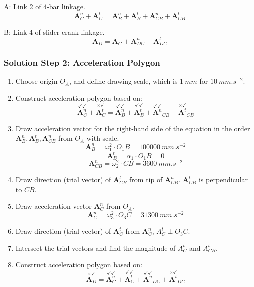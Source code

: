 \documentclass[11pt]{article}
\begin{document}
A: Link 2 of 4-bar linkage.
\[\boldsymbol{A}_C^n + \boldsymbol{A}_C^t = \boldsymbol{A}_B^n + \boldsymbol{A}_B^t + \boldsymbol{A}_{CB}^n + \boldsymbol{A}_{CB}^t\]

B: Link 4 of slider-crank linkage.
\[\boldsymbol{A}_D = \boldsymbol{A}_C + \boldsymbol{A}_{DC}^n + \boldsymbol{A}_{DC}^t\]

 \newpage
\subsubsection{Solution Step 2: Acceleration Polygon}
\label{sec:org25638ee}
\begin{enumerate}
\item Choose origin \(O_A\), and define drawing scale, which is \(\qty{1}{mm}\) for \(\qty{10}{mm.s^{-2}}\).
\item Construct acceleration polygon based on:
\[\overset{\checkmark \checkmark}{\boldsymbol{A}_C^n} + \overset{\times \checkmark}{\boldsymbol{A}_C^t} = \overset{\checkmark \checkmark}{\boldsymbol{A}_B^n} + \overset{\checkmark \checkmark}{\boldsymbol{A}_B^t} + \overset{\checkmark \checkmark}{\boldsymbol{A}^n}_{CB} + \overset{\times \checkmark}{\boldsymbol{A}^t}_{CB}\]
\item Draw acceleration vector for the right-hand side of the equation in the order \(\boldsymbol{A}_B^n, \boldsymbol{A}_B^t, \boldsymbol{A}_{CB}^n\) from \(O_A\) with scale.
\[\boldsymbol{A}_B^n = \omega_1^2 \cdot O_1 B = \qty{100000}{mm.s^{-2}}\]
\[\boldsymbol{A}_B^t = \alpha_1 \cdot O_1 B = 0\]
\[\boldsymbol{A}_{CB}^n = \omega_2^2 \cdot CB = \qty{3600}{mm.s^{-2}}\]
\item Draw direction (trial vector) of \(\boldsymbol{A}_{CB}^t\) from tip of \(\boldsymbol{A}_{CB}^n\). \(\boldsymbol{A}_{CB}^t\) is perpendicular to \(CB\).
\item Draw acceleration vector \(\boldsymbol{A}_C^n\) from \(O_A\).
\[\boldsymbol{A}_C^n = \omega_3^2 \cdot O_3 C = \qty{31300}{mm.s^{-2}}\]
\item Draw direction (trial vector) of \(\boldsymbol{A}_C^t\) from \(\boldsymbol{A}_C^n\), \(A_C^t \perp O_3 C\).
\item Intersect the trial vectors and find the magnitude of \(A_C^t\) and \(A_{CB}^t\).
\item Construct acceleration polygon based on:
\[\overset{\times \checkmark}{\boldsymbol{A}_D} = \overset{\checkmark \checkmark}{\boldsymbol{A}_C^n} + \overset{\checkmark \checkmark}{\boldsymbol{A}_C^t} + \overset{\checkmark \checkmark}{\boldsymbol{A}^n}_{DC} + \overset{\times \checkmark}{\boldsymbol{A}^t}_{DC}\]

\end{enumerate}
\end{document}
